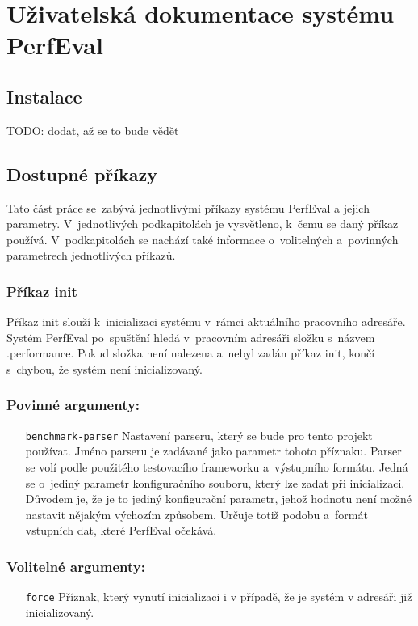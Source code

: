\chapter{Uživatelská dokumentace systému PerfEval}

\section{Instalace}

TODO: dodat, až se to bude vědět

\section{Dostupné příkazy}

Tato část práce se~zabývá jednotlivými příkazy systému PerfEval a jejich parametry.
V~jednotlivých podkapitolách je vysvětleno, k~čemu se daný příkaz používá. V~podkapitolách
se nachází také informace o~volitelných a~povinných parametrech jednotlivých příkazů.

\subsection{Příkaz init}

Příkaz init slouží k~inicializaci systému v~rámci aktuálního pracovního adresáře.
Systém PerfEval po~spuštění hledá v~pracovním adresáři složku s~názvem .performance. Pokud složka
není nalezena a~nebyl zadán příkaz init, končí s~chybou, že systém není inicializovaný.

\subsection*{Povinné argumenty:}
\begin{itemize}[label=\texttt{\textbf{\textendash}}]
    \item[\texttt{benchmark-parser}] Nastavení parseru, který se bude pro tento projekt používat.
        Jméno parseru je zadávané jako parametr tohoto příznaku.
        Parser se volí podle použitého testovacího frameworku a~výstupního formátu.
        Jedná se o~jediný parametr konfiguračního souboru, který lze zadat při inicializaci.
        Důvodem je, že je to jediný konfigurační parametr, jehož hodnotu není možné nastavit nějakým výchozím způsobem.
        Určuje totiž podobu a~formát vstupních dat, které PerfEval očekává.
\end{itemize}

\subsection*{Volitelné argumenty:}
\begin{itemize}[label=\texttt{\textbf{\textendash}}]
    \item[\texttt{force}] Příznak, který vynutí inicializaci i v případě, že je systém v adresáři již inicializovaný.
\end{itemize}

